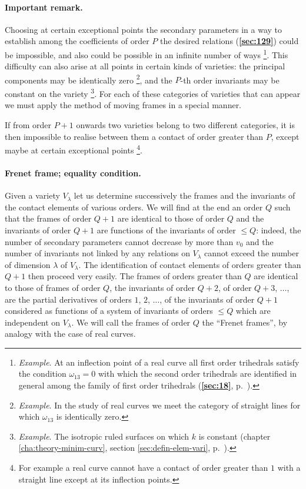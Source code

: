 \documentclass[leqno,11pt]{book}
\numberwithin{equation}{chapter}
\theoremstyle{shape1}
\theoremstyle{shapesmall}
\newcommand{\fsref}[1]{{\rm\textsection\textbf{\ref{sec:#1}}}}
\begin{document}
\paragraph{Important remark.}
\label{sec:130}
Choosing at certain exceptional points the secondary parameters in a way to establish among the coefficients of order $P$ the desired relations (\fsref{129}) could be impossible, and also could be possible in an infinite number of ways \footnote{\emph{Example}. At an inflection point of a real curve all first order trihedrals satisfy the condition $\omega_{13}=0$ with which the second order trihedrals are identified in general among the family of first order trihedrals (\fsref{18}, p.~\pageref{sec:18}).}. This difficulty can also arise at all points in certain kinds of varieties: the principal components may be identically zero \footnote{\emph{Example}. In the study of real curves we meet the category of straight lines for which $\omega_{13}$ is identically zero.}, and the $P$-th order invariants may be constant on the variety \footnote{\emph{Example}. The isotropic ruled surfaces on which $k$ is constant (chapter \ref{cha:theory-minim-curv}, section \ref{sec:defin-elem-vari}, p.~\pageref{sec:defin-elem-vari}).}. For each of these categories of varieties that can appear we must apply the method of moving frames in a special manner.

If from order $P+1$ onwards two varieties belong to two different categories, it is then impossible to realise between them a contact of order greater than $P$, except maybe at certain exceptional points \footnote{For example a real curve cannot have a contact of order greater than $1$ with a straight line except at its inflection points.}.

\paragraph{Frenet frame; equality condition.}
\label{sec:131}
Given a variety $V_{\lambda}$ let us determine successively the frames and the invariants of the contact elements of various orders. We will find at the end an order $Q$ such that the frames of order $Q+1$ are identical to those of order $Q$ and the invariants of order $Q+1$ are functions of the invariants of order $\le Q$: indeed, the number of secondary parameters cannot decrease by more than $v_{0}$ and the number of invariants not linked by any relations on $V_{\lambda}$ cannot exceed the number of dimension $\lambda$ of $V_{\lambda}$. The identification of contact elements of orders greater than $Q+1$ then proceed very easily. The frames of orders greater than $Q$ are identical to those of frames of order $Q$, the invariants of order $Q+2$, of order $Q+3$, $\dots$, are the partial derivatives of orders $1$, $2$, $\dots$, of the invariants of order $Q+1$ considered as functions of a system of invariants of orders $\le Q$ which are independent on $V_{\lambda}$. We will call the frames of order $Q$ the ``Frenet frames'', by analogy with the case of real curves.
\end{document}
